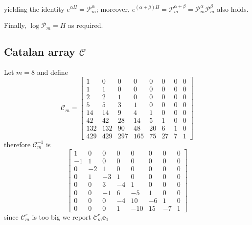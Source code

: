 yielding the identity $e^{\alpha H} = \mathcal{P}_{m}^{\alpha}$;
moreover, $e^{(\alpha+\beta) H} = \mathcal{P}_{m}^{\alpha+\beta} = \mathcal{P}_{m}^{\alpha}\mathcal{P}_{m}^{\beta} $ also holds.

Finally, $\log{\mathcal{P}_{m}}=H$ as required.

\subsection{Catalan array $\mathcal{C}$}

Let $m=8$ and define
\begin{displaymath}
\mathcal{C}_{m}=\left[\begin{matrix}1 & 0 & 0 & 0 & 0 & 0 & 0 & 0\\1 & 1 & 0 & 0 & 0 & 0 & 0 & 0\\2 & 2 & 1 & 0 & 0 & 0 & 0 & 0\\5 & 5 & 3 & 1 & 0 & 0 & 0 & 0\\14 & 14 & 9 & 4 & 1 & 0 & 0 & 0\\42 & 42 & 28 & 14 & 5 & 1 & 0 & 0\\132 & 132 & 90 & 48 & 20 & 6 & 1 & 0\\429 & 429 & 297 & 165 & 75 & 27 & 7 & 1\end{matrix}\right]
\end{displaymath}
therefore $\mathcal{C}_{m}^{-1}$ is
\begin{displaymath}
\left[\begin{matrix}1 & 0 & 0 & 0 & 0 & 0 & 0 & 0\\-1 & 1 & 0 & 0 & 0 & 0 & 0 & 0\\0 & -2 & 1 & 0 & 0 & 0 & 0 & 0\\0 & 1 & -3 & 1 & 0 & 0 & 0 & 0\\0 & 0 & 3 & -4 & 1 & 0 & 0 & 0\\0 & 0 & -1 & 6 & -5 & 1 & 0 & 0\\0 & 0 & 0 & -4 & 10 & -6 & 1 & 0\\0 & 0 & 0 & 1 & -10 & 15 & -7 & 1\end{matrix}\right]
\end{displaymath}
since $\mathcal{C}_{m}^{r}$ is too big we report $\mathcal{C}_{m}^{r}\textbf{e}_{1}$ 
